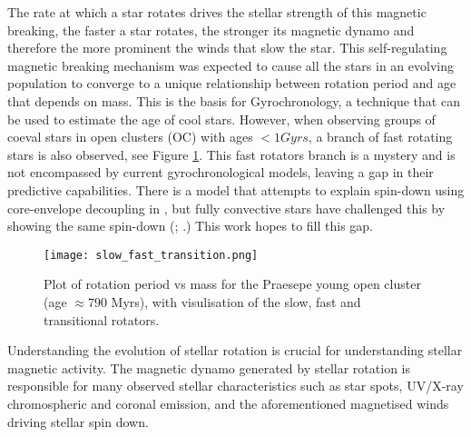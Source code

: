 \documentclass[fleqn,usenatbib]{mnras}
\begin{document}
The rate at which a star rotates drives the stellar strength of this magnetic breaking, the faster a star rotates, the stronger its magnetic dynamo and therefore the more prominent the winds that slow the star.
This self-regulating magnetic breaking mechanism was expected to cause all the stars in an evolving population to converge to a unique relationship between rotation period and age that depends on mass.
This is the basis for Gyrochronology, a technique that can be used to estimate the age of cool stars.
However, when observing groups of coeval stars in open clusters (OC) with ages $< 1Gyrs$, a branch of fast rotating stars is also observed, see Figure \ref{fig:slow_fast_transition}.
This fast rotators branch is a mystery and is not encompassed by current gyrochronological models, leaving a gap in their predictive capabilities.
There is a model that attempts to explain spin-down using core-envelope decoupling in \cite{core_env}, but fully convective stars have challenged this by showing the same spin-down (\cite{2016ApJ...821...93N}; \cite{2017ApJ...842...83D}.)
This work hopes to fill this gap.


\begin{figure}
	\texttt{[image: slow\_fast\_transition.png]}
	\caption[]{Plot of rotation period vs mass for the Praesepe young open cluster (age $\approx 790$ Myrs), with visulisation of the slow, fast and transitional rotators.}
	\label{fig:slow_fast_transition}
\end{figure}

Understanding the evolution of stellar rotation is crucial for understanding stellar magnetic activity.
The magnetic dynamo generated by stellar rotation is responsible for many observed stellar characteristics such as star spots, UV/X-ray chromospheric and coronal emission, and the aforementioned magnetised winds driving stellar spin down.
\end{document}
